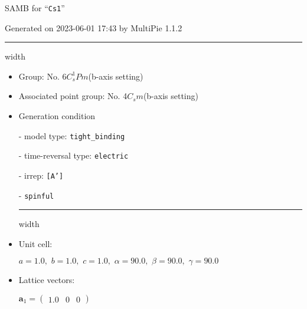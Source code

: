 \documentclass[fleqn,10pt,landscape]{article}
\begin{document}
\setcounter{MaxMatrixCols}{16}

\setlength{\baselineskip}{16pt}
\footnotesize
\begin{center}
\LARGE
SAMB for ``\texttt{Cs1}''
\end{center}
\begin{flushright}
Generated on 2023-06-01 17:43 by MultiPie 1.1.2
\end{flushright}
\vspace{1cm}


 \hfil \hrule height 1mm width \textwidth \hfil

\begin{itemize}
\item Group: No. 6\quad$C_{s}^{1}$\quad$Pm$\quad(b-axis setting)\quad[ monoclinic ]

\item Associated point group: No. 4\quad$C_{s}$\quad$m$\quad(b-axis setting)\quad[ monoclinic ]

\vspace{5mm}

\item Generation condition

\quad - model type: \texttt{tight_binding}

\quad - time-reversal type: \texttt{electric}

\quad - irrep: \texttt{[A']}

\quad - \texttt{spinful}


 \hfil \hrule height 1mm width \textwidth \hfil

\item Unit cell:

\quad $a=1.0,\,\, b=1.0,\,\, c=1.0,\,\, \alpha=90.0,\,\, \beta=90.0,\,\, \gamma=90.0$

\item Lattice vectors:

\quad $\bm{a}_1=\begin{pmatrix} 1.0 & 0 & 0 \end{pmatrix}$


\end{itemize}
\end{document}
